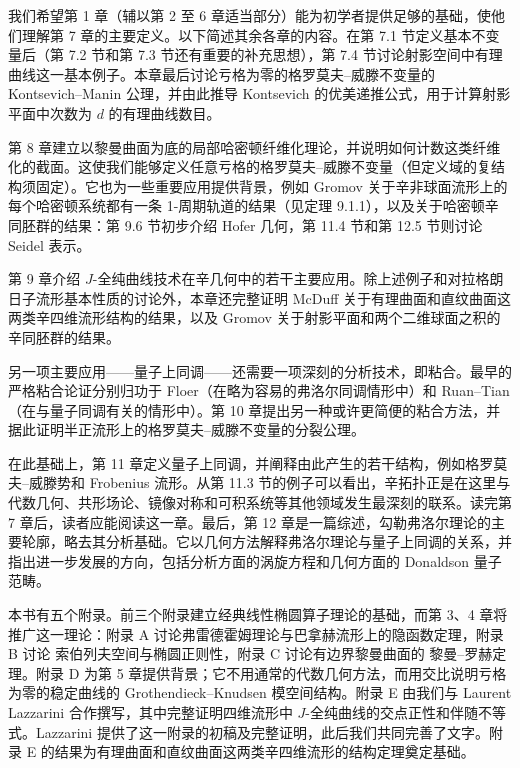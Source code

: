 我们希望第 1 章（辅以第 2 至 6 章适当部分）能为初学者提供足够的基础，使他们理解第 7 章的主要定义。以下简述其余各章的内容。在第 7.1 节定义基本不变量后（第 7.2 节和第 7.3 节还有重要的补充思想），第 7.4 节讨论射影空间中有理曲线这一基本例子。本章最后讨论亏格为零的格罗莫夫--威滕不变量的 Kontsevich--Manin 公理，并由此推导 Kontsevich 的优美递推公式，用于计算射影平面中次数为 $d$ 的有理曲线数目。

第 8 章建立以黎曼曲面为底的局部哈密顿纤维化理论，并说明如何计数这类纤维化的截面。这使我们能够定义任意亏格的格罗莫夫--威滕不变量（但定义域的复结构须固定）。它也为一些重要应用提供背景，例如 Gromov 关于辛非球面流形上的每个哈密顿系统都有一条 1-周期轨道的结果（见定理 9.1.1），以及关于哈密顿辛同胚群的结果：第 9.6 节初步介绍 Hofer 几何，第 11.4 节和第 12.5 节则讨论 Seidel 表示。

第 9 章介绍 $J$-全纯曲线技术在辛几何中的若干主要应用。除上述例子和对拉格朗日子流形基本性质的讨论外，本章还完整证明 McDuff 关于有理曲面和直纹曲面这两类辛四维流形结构的结果，以及 Gromov 关于射影平面和两个二维球面之积的辛同胚群的结果。

另一项主要应用——量子上同调——还需要一项深刻的分析技术，即粘合。最早的严格粘合论证分别归功于 Floer（在略为容易的弗洛尔同调情形中）和 Ruan--Tian（在与量子同调有关的情形中）。第 10 章提出另一种或许更简便的粘合方法，并据此证明半正流形上的格罗莫夫--威滕不变量的分裂公理。

在此基础上，第 11 章定义量子上同调，并阐释由此产生的若干结构，例如格罗莫夫--威滕势和 Frobenius 流形。从第 11.3 节的例子可以看出，辛拓扑正是在这里与代数几何、共形场论、镜像对称和可积系统等其他领域发生最深刻的联系。读完第 7 章后，读者应能阅读这一章。最后，第 12 章是一篇综述，勾勒弗洛尔理论的主要轮廓，略去其分析基础。它以几何方法解释弗洛尔理论与量子上同调的关系，并指出进一步发展的方向，包括分析方面的涡旋方程和几何方面的 Donaldson 量子范畴。

本书有五个附录。前三个附录建立经典线性椭圆算子理论的基础，而第 3、4 章将推广这一理论：附录 A 讨论弗雷德霍姆理论与巴拿赫流形上的隐函数定理，附录 B 讨论 索伯列夫空间与椭圆正则性，附录 C 讨论有边界黎曼曲面的 黎曼--罗赫定理。附录 D 为第 5 章提供背景；它不用通常的代数几何方法，而用交比说明亏格为零的稳定曲线的 Grothendieck--Knudsen 模空间结构。附录 E 由我们与 Laurent Lazzarini 合作撰写，其中完整证明四维流形中 $J$-全纯曲线的交点正性和伴随不等式。Lazzarini 提供了这一附录的初稿及完整证明，此后我们共同完善了文字。附录 E 的结果为有理曲面和直纹曲面这两类辛四维流形的结构定理奠定基础。

